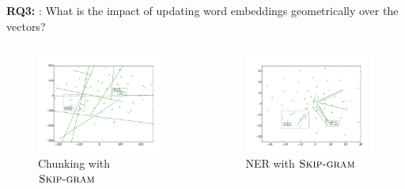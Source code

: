 \documentclass{beamer}
\newcommand{\method}[2][]{\ensuremath{\textsc{#2#1}}\xspace}
\newcommand{\Skipgram}[1][]{\method[#1]{Skip-gram}}
\newcommand{\task}[1]{\textsf{#1}\xspace}
\newcommand{\chunking}{\task{Chunking}}
\newcommand{\ner}{\task{NER}}
\begin{document}
\begin{frame}

\begin{enumerate}
\begin{small}
\item[\bf RQ3:]: What is the impact of updating word embeddings geometrically over the vectors?
\end{small}
\end{enumerate}

\begin{columns}	
	  \begin{figure}
	   \includegraphics[width=\textwidth]{../plots/vectorField/Lizhen/scaled/Lizhen_skip_chunking}
	   \caption{\chunking with \Skipgram}
	   \end{figure}
	  \begin{figure}
	   \includegraphics[width=\textwidth]{../plots/vectorField/Lizhen/Lizhen_skip_NER}    
   	    \caption{\ner with \Skipgram}
	   \end{figure}	    	
\end{columns}
\end{frame}
\end{document}
